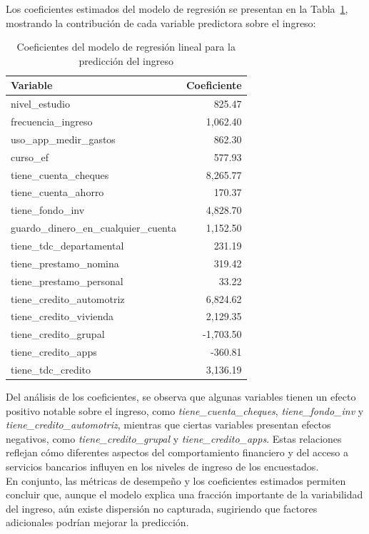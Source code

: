 \documentclass{article}
\begin{document}
{Los coeficientes estimados del modelo de regresión se presentan en la Tabla~\ref{tab:coef_regresion}, mostrando la contribución de cada variable predictora sobre el ingreso:

\begin{table}[h!]
\centering
\caption{Coeficientes del modelo de regresión lineal para la predicción del ingreso}
\label{tab:coef_regresion}
\begin{tabular}{l r}
\hline
\textbf{Variable} & \textbf{Coeficiente} \\
\hline
nivel\_estudio & 825.47 \\
frecuencia\_ingreso & 1,062.40 \\
uso\_app\_medir\_gastos & 862.30 \\
curso\_ef & 577.93 \\
tiene\_cuenta\_cheques & 8,265.77 \\
tiene\_cuenta\_ahorro & 170.37 \\
tiene\_fondo\_inv & 4,828.70 \\
guardo\_dinero\_en\_cualquier\_cuenta & 1,152.50 \\
tiene\_tdc\_departamental & 231.19 \\
tiene\_prestamo\_nomina & 319.42 \\
tiene\_prestamo\_personal & 33.22 \\
tiene\_credito\_automotriz & 6,824.62 \\
tiene\_credito\_vivienda & 2,129.35 \\
tiene\_credito\_grupal & -1,703.50 \\
tiene\_credito\_apps & -360.81 \\
tiene\_tdc\_credito & 3,136.19 \\
\hline
\end{tabular}
\end{table}

Del análisis de los coeficientes, se observa que algunas variables tienen un efecto positivo notable sobre el ingreso, como \textit{tiene\_cuenta\_cheques}, \textit{tiene\_fondo\_inv} y \textit{tiene\_credito\_automotriz}, mientras que ciertas variables presentan efectos negativos, como \textit{tiene\_credito\_grupal} y \textit{tiene\_credito\_apps}. Estas relaciones reflejan cómo diferentes aspectos del comportamiento financiero y del acceso a servicios bancarios influyen en los niveles de ingreso de los encuestados.\\

En conjunto, las métricas de desempeño y los coeficientes estimados permiten concluir que, aunque el modelo explica una fracción importante de la variabilidad del ingreso, aún existe dispersión no capturada, sugiriendo que factores adicionales podrían mejorar la predicción.


}
\end{document}
